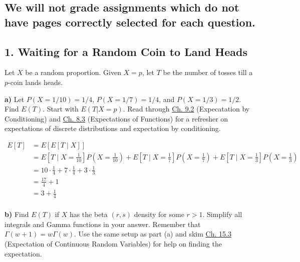 \documentclass[11pt]{article}
\begin{document}
\hypertarget{we-will-not-grade-assignments-which-do-not-have-pages-correctly-selected-for-each-question.}{%
\subsection{\texorpdfstring{\textbf{We will not grade assignments which
do not have pages correctly selected for each
question.}}{We will not grade assignments which do not have pages correctly selected for each question.}}\label{we-will-not-grade-assignments-which-do-not-have-pages-correctly-selected-for-each-question.}}

    \newpage

    \hypertarget{waiting-for-a-random-coin-to-land-heads}{%
\subsection{1. Waiting for a Random Coin to Land
Heads}\label{waiting-for-a-random-coin-to-land-heads}}

Let \(X\) be a random proportion. Given \(X=p\), let \(T\) be the number
of tosses till a \(p\)-coin lands heads.

\textbf{a)} Let \(P(X = 1/10) = 1/4\), \(P(X = 1/7) = 1/4\), and
\(P(X = 1/3) = 1/2\). Find \(E(T)\). Start with \(E(T|X = p)\). Read
through
\href{https://data140.org/textbook/content/chapter-09/expectation-by-conditioning/}{Ch.
9.2} (Expecatation by Conditioning) and
\href{https://data140.org/textbook/content/chapter-08/expectations-of-functions/}{Ch.
8.3} (Expectations of Functions) for a refresher on expectations of
discrete distributions and expectation by conditioning.

\begin{align*}
	E[T] &= E[E[T \mid X]]  \\ 
	&= E[T \mid X = \frac{1}{10}]P(X = \frac{1}{10}) + E[T \mid X = \frac{1}{7}]P(X =\frac{1}{7}) + E[T \mid X = \frac{1}{3}]P(X=\frac{1}{3}) \\
&= 10 \cdot \frac{1}{4} + 7 \cdot \frac{1}{4} + 3 \cdot \frac{1}{3} \\
&= \frac{17}{4} + 1 \\
&= 3 + \frac{1}{4} \\
\end{align*}



\textbf{b)} Find \(E(T)\) if \(X\) has the beta \((r, s)\) density for
some \(r > 1\). Simplify all integrals and Gamma functions in your
answer. Remember that \(\Gamma(w+1) = w\Gamma(w)\). Use the same setup
as part (a) and skim
\href{https://data140.org/textbook/content/chapter-15/expectation/}{Ch.
15.3} (Expectation of Continuous Random Variables) for help on finding
the expectation.
\end{document}
